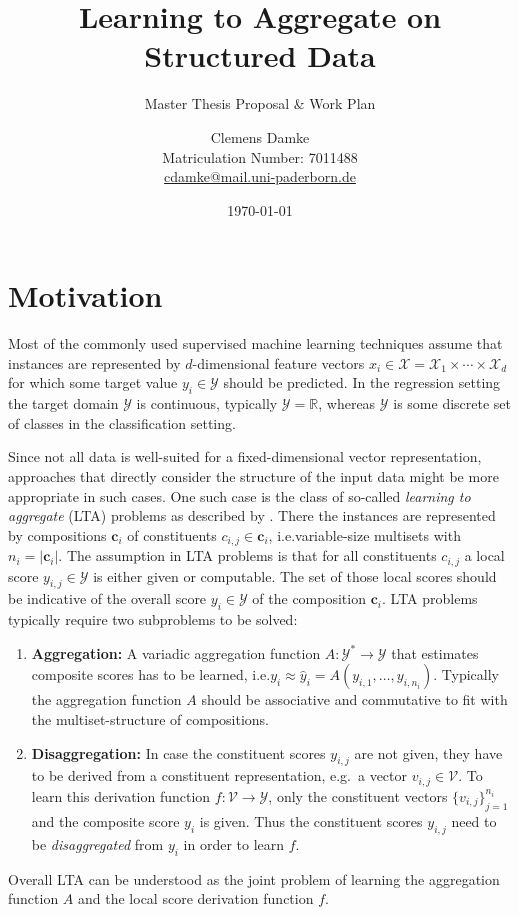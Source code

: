 \documentclass[12pt]{scrartcl}
\makeatletter
\newcommand{\thesisTitle}{Learning to Aggregate on Structured Data}
\newcommand{\thesisSubject}{Master Thesis Proposal \& Work Plan}
\newcommand{\thesisName}{Clemens Damke}
\newcommand{\thesisMail}{cdamke@mail.uni-paderborn.de}
\newcommand{\thesisMatNr}{7011488}
\makeatother
\begin{document}
\title{\thesisTitle}
\subtitle{\thesisSubject}
\author{{\thesisName}\\\small{Matriculation Number: \thesisMatNr}\\\small{\href{mailto:\thesisMail}{\thesisMail}}}
\date{\today}
\maketitle

\section{Motivation}%
\label{sec:motivation}

Most of the commonly used supervised machine learning techniques assume that instances are represented by $d$-dimensional feature vectors $x_i \in \mathcal{X} = \mathcal{X}_1 \times \cdots \times \mathcal{X}_d$ for which some target value $y_i \in \mathcal{Y}$ should be predicted.
In the regression setting the target domain $\mathcal{Y}$ is continuous, typically $\mathcal{Y} = \mathbb{R}$, whereas $\mathcal{Y}$ is some discrete set of classes in the classification setting.

Since not all data is well-suited for a fixed-dimensional vector representation, approaches that directly consider the structure of the input data might be more appropriate in such cases.
One such case is the class of so-called \textit{learning to aggregate} (LTA) problems as described by \citet{Melnikov2016}.
There the instances are represented by compositions $\bm{c}_i$ of constituents $c_{i,j} \in \bm{c}_i$, i.e.\@ variable-size multisets with $n_i = |\bm{c}_i|$.
The assumption in LTA problems is that for all constituents $c_{i,j}$ a local score $y_{i,j} \in \mathcal{Y}$ is either given or computable.
The set of those local scores should be indicative of the overall score $y_i \in \mathcal{Y}$ of the composition $\bm{c}_i$.
LTA problems typically require two subproblems to be solved:
\begin{enumerate}[label=\textbf{\arabic*.}]
	\item \textbf{Aggregation:}
		A variadic aggregation function $A: \mathcal{Y}^{*} \to \mathcal{Y}$ that estimates composite scores has to be learned, i.e.\@ $y_i \approx \hat{y}_i = A(y_{i,1}, \dots, y_{i,n_i})$.
		Typically the aggregation function $A$ should be associative and commutative to fit with the multiset-structure of compositions.
	\item \textbf{Disaggregation:}
		In case the constituent scores $y_{i,j}$ are not given, they have to be derived from a constituent representation, e.g.\ a vector $v_{i,j} \in \mathcal{V}$.
		To learn this derivation function $f: \mathcal{V} \to \mathcal{Y}$, only the constituent vectors ${\{v_{i,j}\}}_{j = 1}^{n_i}$ and the composite score $y_i$ is given.
		Thus the constituent scores $y_{i,j}$ need to be \textit{disaggregated} from $y_i$ in order to learn $f$.
\end{enumerate}
Overall LTA can be understood as the joint problem of learning the aggregation function $A$ and the local score derivation function $f$.
\end{document}
